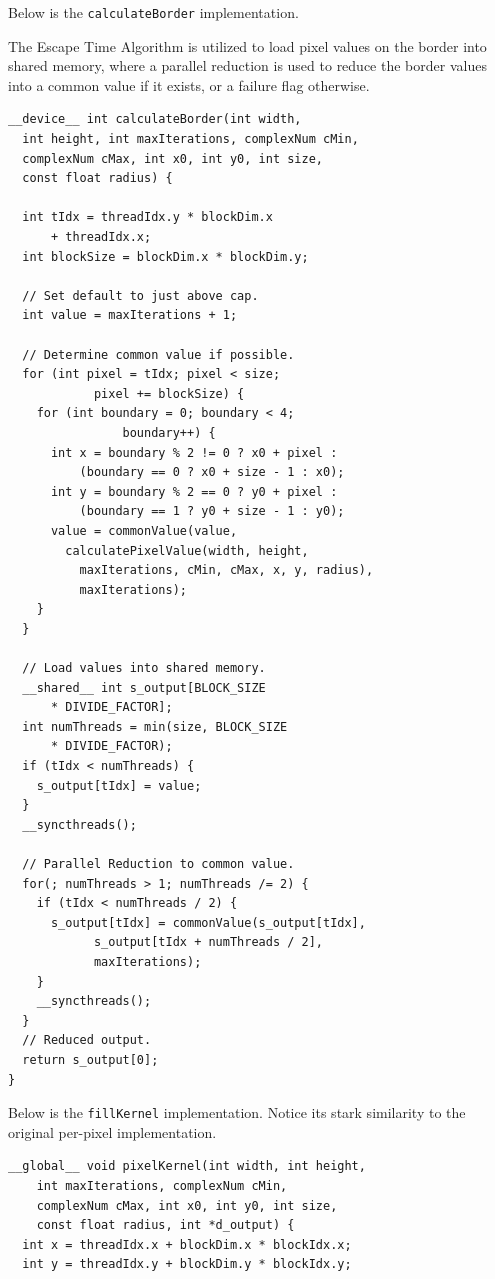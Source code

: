 \documentclass[letterpaper]{article}
\begin{document}
\begin{multicols}{2}
Below is the \texttt{calculateBorder} implementation. 

The Escape Time Algorithm is utilized to load pixel values on the border into
  shared memory, where a parallel reduction is used to reduce the border values
  into a common value if it exists, or a failure flag otherwise. 

\begin{lstlisting}
__device__ int calculateBorder(int width, 
  int height, int maxIterations, complexNum cMin, 
  complexNum cMax, int x0, int y0, int size, 
  const float radius) {

  int tIdx = threadIdx.y * blockDim.x 
      + threadIdx.x;
  int blockSize = blockDim.x * blockDim.y;

  // Set default to just above cap.
  int value = maxIterations + 1;

  // Determine common value if possible.
  for (int pixel = tIdx; pixel < size; 
			pixel += blockSize) {
    for (int boundary = 0; boundary < 4; 
				boundary++) {
      int x = boundary % 2 != 0 ? x0 + pixel : 
          (boundary == 0 ? x0 + size - 1 : x0); 
      int y = boundary % 2 == 0 ? y0 + pixel : 
          (boundary == 1 ? y0 + size - 1 : y0);
      value = commonValue(value, 
        calculatePixelValue(width, height, 
          maxIterations, cMin, cMax, x, y, radius), 
          maxIterations);
    }
  }

  // Load values into shared memory.
  __shared__ int s_output[BLOCK_SIZE 
      * DIVIDE_FACTOR];
  int numThreads = min(size, BLOCK_SIZE 
      * DIVIDE_FACTOR);
  if (tIdx < numThreads) {
    s_output[tIdx] = value;
  }
  __syncthreads();

  // Parallel Reduction to common value.
  for(; numThreads > 1; numThreads /= 2) {
    if (tIdx < numThreads / 2) {
      s_output[tIdx] = commonValue(s_output[tIdx], 
            s_output[tIdx + numThreads / 2], 
            maxIterations);
    }
    __syncthreads();
  }
  // Reduced output.
  return s_output[0];
}
\end{lstlisting}

Below is the \texttt{fillKernel} implementation. 
Notice its stark similarity to the original per-pixel implementation.

\begin{lstlisting}
__global__ void pixelKernel(int width, int height, 
    int maxIterations, complexNum cMin, 
    complexNum cMax, int x0, int y0, int size, 
    const float radius, int *d_output) {
  int x = threadIdx.x + blockDim.x * blockIdx.x;
  int y = threadIdx.y + blockDim.y * blockIdx.y;


\end{lstlisting}
\end{multicols}
\end{document}
